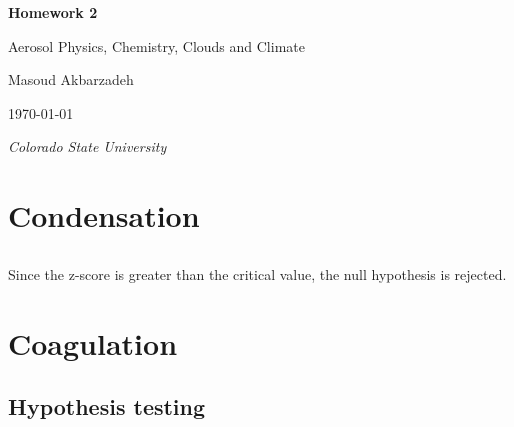 \documentclass[12pt]{article}
\begin{document}
\begin{titlepage}
\centering
{\LARGE\bfseries Homework 2}

\vspace{1cm}

{\Large Aerosol Physics, Chemistry, Clouds and Climate}

\vspace{2cm}

{\large Masoud Akbarzadeh}

\vspace{2cm}

{ \today }

\vfill

{\itshape Colorado State University}
\end{titlepage}



\section{Condensation}\label{sec:problem-1}
\subsection{}\label{subsec:problem-1-a}





\subsection{}\label{subsec:problem-1-b}


Since the z-score is greater than the critical value, the null hypothesis is rejected.

\subsection{}\label{subsec:problem-1-c}


\newpage
\section{Coagulation}\label{sec:problem-2}
\subsection{Hypothesis testing}\label{subsec:problem-2-a}
\end{document}
